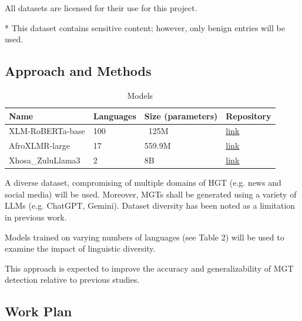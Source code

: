 \documentclass[11pt, a4paper,twocolumn]{article}
\begin{document}
All datasets are licensed for their use for this project.

* This dataset contains sensitive content; however, only benign entries will be used.



\subsection{Approach and Methods}

\begin{table}[tp]
\centering
\begin{tabular}{l l l l}
\toprule
\textbf{Name} & \textbf{Languages} & \textbf{Size (parameters)} & \textbf{Repository} \\
\midrule
XLM-RoBERTa-base
    & 100
    & ~125M
    & \href{https://huggingface.co/docs/transformers/en/model_doc/xlm-roberta}{\uline{link}} \\
AfroXLMR-large
    & 17
    & 559.9M
    & \href{https://huggingface.co/Davlan/afro-xlmr-large}{\uline{link}} \\
Xhosa\_ZuluLlama3
    & 2 
    & 8B 
    & \href{https://huggingface.co/Jacaranda/Xhosa_ZuluLlama3_v1}{\uline{link}} \\
\bottomrule
\end{tabular}
\caption{Models}
\end{table}

A diverse dataset, compromising of multiple domains of HGT (e.g. news and social media) will be used. Moreover, MGTs shall be generated using a variety of LLMs (e.g. ChatGPT, Gemini). Dataset diversity has been noted as a limitation in previous work.


Models trained on varying numbers of languages (see Table 2) will be used to examine the impact of linguistic diversity.


This approach is expected to improve the accuracy and generalizability of MGT detection relative to previous studies.


\subsection{Work Plan}
\end{document}
